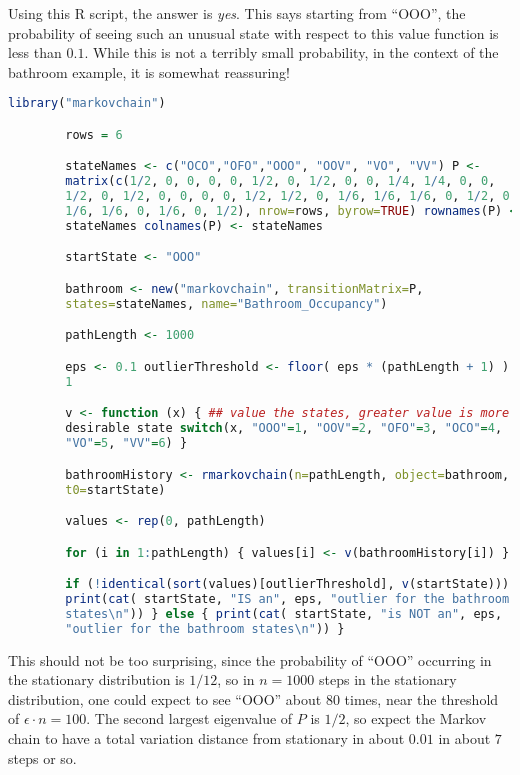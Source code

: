 \documentclass[12pt]{article}
\begin{document}
\begin{solution}
    Using this R script, the answer is \emph{yes}.  This says starting
    from ``OOO'', the probability of seeing such an unusual state with
    respect to this value function is less than \( 0.1 \).  While this
    is not a terribly small probability, in the context of the bathroom
    example, it is somewhat reassuring!

    \begin{lstlisting}[language=R]
        library("markovchain")

        rows = 6

        stateNames <- c("OCO","OFO","OOO", "OOV", "VO", "VV") P <-
        matrix(c(1/2, 0, 0, 0, 0, 1/2, 0, 1/2, 0, 0, 1/4, 1/4, 0, 0,
        1/2, 0, 1/2, 0, 0, 0, 0, 1/2, 1/2, 0, 1/6, 1/6, 1/6, 0, 1/2, 0,
        1/6, 1/6, 0, 1/6, 0, 1/2), nrow=rows, byrow=TRUE) rownames(P) <-
        stateNames colnames(P) <- stateNames

        startState <- "OOO"

        bathroom <- new("markovchain", transitionMatrix=P,
        states=stateNames, name="Bathroom_Occupancy")

        pathLength <- 1000

        eps <- 0.1 outlierThreshold <- floor( eps * (pathLength + 1) ) +
        1

        v <- function (x) { ## value the states, greater value is more
        desirable state switch(x, "OOO"=1, "OOV"=2, "OFO"=3, "OCO"=4,
        "VO"=5, "VV"=6) }

        bathroomHistory <- rmarkovchain(n=pathLength, object=bathroom,
        t0=startState)

        values <- rep(0, pathLength)

        for (i in 1:pathLength) { values[i] <- v(bathroomHistory[i]) }

        if (!identical(sort(values)[outlierThreshold], v(startState))) {%
        print(cat( startState, "IS an", eps, "outlier for the bathroom
        states\n")) } else { print(cat( startState, "is NOT an", eps,
        "outlier for the bathroom states\n")) }
    \end{lstlisting}

    This should not be too surprising, since the probability of ``OOO''
    occurring in the stationary distribution is \( 1/12 \), so in \(
    n=1000 \) steps in the stationary distribution, one could expect to
    see ``OOO'' about \( 80 \) times, near the threshold of \( \epsilon
    \cdot n = 100 \).  The second largest eigenvalue of \( P \) is \(
    1/2 \), so expect the Markov chain to have a total variation
    distance from stationary in about \( 0.01 \) in about \( 7 \) steps
    or so.
\end{solution}
\end{document}
